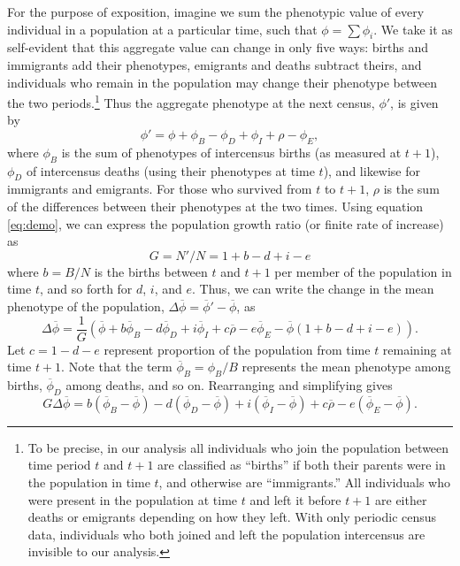 \documentclass[11pt]{article}
\begin{document}
For the purpose of exposition, imagine we sum the phenotypic value of every individual in a population at a particular time, such that $\phi = \sum \phi_i$.  We take it as self-evident that this aggregate value can change in only five ways: births and immigrants add their phenotypes, emigrants and deaths subtract theirs, and individuals who remain in the population may change their phenotype between the two periods.\footnote{To be precise, in our analysis all individuals who join the population between time period $t$ and $t+1$ are classified as ``births'' if both their parents were in the population in time $t$, and otherwise are ``immigrants.''  All individuals who were present in the population at time $t$ and left it before $t+1$ are either deaths or emigrants depending on how they left.  With only periodic census data, individuals who both joined and left the population intercensus are invisible to our analysis.}  Thus the aggregate phenotype at the next census, $\phi'$, is given by
	\[\phi' = \phi + \phi_B - \phi_D  + \phi_I + \rho - \phi_E, 
\]
where $\phi_B$ is the sum of phenotypes of intercensus births (as measured at $t+1$), $\phi_D$ of intercensus deaths (using their phenotypes at time $t$), and likewise for immigrants and emigrants.  For those who survived from $t$ to $t+1$, $\rho$ is the sum of the differences between their phenotypes at the two times.  Using equation \ref{eq:demo}, we can express the population growth ratio (or finite rate of increase) as 
	\[G = N'/N  = 1 + b - d + i - e
\]
where $b=B/N$ is the births between $t$ and $t+1$ per member of the population in time $t$, and so forth for $d$, $i$, and $e$.  Thus, we can write the change in the mean phenotype of the population, $\Delta \overline{\phi} = \overline{\phi}' - \overline{\phi}$, as
	\[\Delta \overline{\phi} = \frac{1}{G}\left(\overline{\phi} + b\overline{\phi}_B - d\overline{\phi}_D + i\overline{\phi}_I + c\overline{\rho} - e\overline{\phi}_E - \overline{\phi}(1 + b - d + i - e)\right).
\]
Let $c=1-d-e$ represent proportion of the population from time $t$ remaining at time $t+1$.  Note that the term $\overline{\phi}_B= \phi_B/B$ represents the mean phenotype among births, $\overline{\phi}_D$ among deaths, and so on.  Rearranging and simplifying gives 
\begin{equation} \label{eq:BDICE}
G \Delta \overline{\phi} =  b(\overline{\phi}_B - \overline{\phi}) - d(\overline{\phi}_D - \overline{\phi}) + i(\overline{\phi}_I - \overline{\phi}) + c \overline{\rho} - e(\overline{\phi}_E - \overline{\phi}).
\end{equation}
\end{document}
